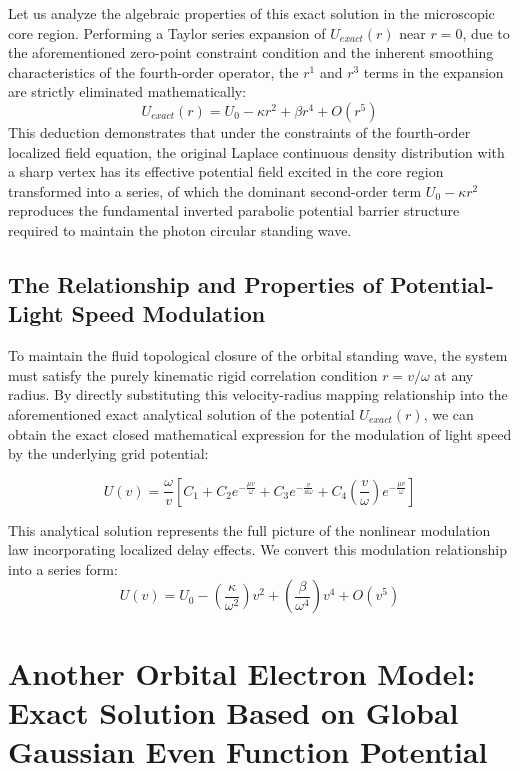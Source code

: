 \documentclass[12pt, a4paper]{article}
\begin{document}
Let us analyze the algebraic properties of this exact solution in the microscopic core region. Performing a Taylor series expansion of $U_{exact}(r)$ near $r=0$, due to the aforementioned zero-point constraint condition and the inherent smoothing characteristics of the fourth-order operator, the $r^1$ and $r^3$ terms in the expansion are strictly eliminated mathematically:
\begin{equation}
U_{exact}(r) = U_0 - \kappa r^2 + \beta r^4 + O(r^5) 
\end{equation}
This deduction demonstrates that under the constraints of the fourth-order localized field equation, the original Laplace continuous density distribution with a sharp vertex has its effective potential field excited in the core region transformed into a series, of which the dominant second-order term $U_0 - \kappa r^2$ reproduces the fundamental inverted parabolic potential barrier structure required to maintain the photon circular standing wave.

\subsection{The Relationship and Properties of Potential-Light Speed Modulation}

To maintain the fluid topological closure of the orbital standing wave, the system must satisfy the purely kinematic rigid correlation condition $r = v/\omega$ at any radius. By directly substituting this velocity-radius mapping relationship into the aforementioned exact analytical solution of the potential $U_{exact}(r)$, we can obtain the exact closed mathematical expression for the modulation of light speed by the underlying grid potential:

\begin{equation}
U(v) = \frac{\omega}{v} \left[ C_1 + C_2 e^{-\frac{\mu v}{\omega}} + C_3 e^{-\frac{v}{a \omega}} + C_4 \left(\frac{v}{\omega}\right) e^{-\frac{\mu v}{\omega}} \right] 
\end{equation}

This analytical solution represents the full picture of the nonlinear modulation law incorporating localized delay effects. We convert this modulation relationship into a series form:
\begin{equation}
U(v) = U_0 - \left(\frac{\kappa}{\omega^2}\right) v^2 + \left(\frac{\beta}{\omega^4}\right) v^4 + O(v^5)
\end{equation}


\section{Another Orbital Electron Model: Exact Solution Based on Global Gaussian Even Function Potential}
\end{document}
